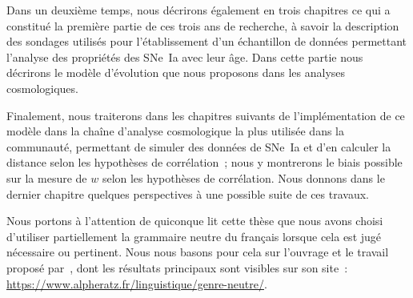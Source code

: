 \documentclass[../main/main.tex]{subfiles}
\begin{document}
Dans un deuxième temps, nous décrirons également en trois chapitres ce qui a
constitué la première partie de ces trois ans de recherche, à savoir la
description des sondages utilisés pour l'établissement d'un échantillon de
données permettant l'analyse des propriétés des SNe~Ia avec leur âge. Dans cette
partie nous décrirons le modèle d'évolution que nous proposons dans les analyses
cosmologiques.

Finalement, nous traiterons dans les chapitres suivants de l'implémentation de
ce modèle dans la chaîne d'analyse cosmologique la plus utilisée dans la
communauté, permettant de simuler des données de SNe~Ia et d'en calculer la
distance selon les hypothèses de corrélation~; nous y montrerons le biais
possible sur la mesure de $w$ selon les hypothèses de corrélation. Nous donnons
dans le dernier chapitre quelques perspectives à une possible suite de ces
travaux.

\vfill

Nous portons à l'attention de quiconque lit cette thèse que nous avons choisi
d'utiliser partiellement la grammaire neutre du français lorsque cela est jugé
nécessaire ou pertinent. Nous nous basons pour cela sur l'ouvrage et le travail
proposé par~\cite{alpheratz2018}, dont les résultats principaux sont visibles
sur son site~: \href{https://www.alpheratz.fr/linguistique/genre-neutre/}
{https://www.alpheratz.fr/linguistique/genre-neutre/}.

\vfill

% 
% 
\end{document}
